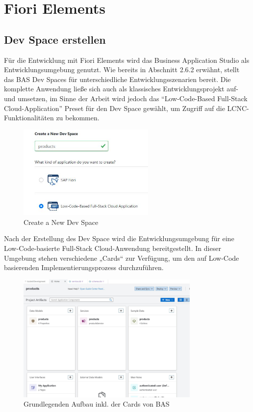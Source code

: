 \section{Fiori Elements}
\subsection{Dev Space erstellen}

Für die Entwicklung mit Fiori Elements wird das Business Application Studio als Entwicklungsumgebung genutzt. Wie bereits in Abschnitt 2.6.2 erwähnt, stellt das BAS Dev Spaces für unterschiedliche Entwicklungsszenarien bereit. Die komplette Anwendung ließe sich auch als klassisches Entwicklungsprojekt auf- und umsetzen, im Sinne der Arbeit wird jedoch das “Low-Code-Based Full-Stack Cloud-Application” Preset für den Dev Space gewählt, um Zugriff auf die LCNC-Funktionalitäten zu bekommen. 

\begin{figure}[htbp]
 \centering
 \includegraphics[width=0.6\textwidth]{Bilder/fiori_element/3_2_create dev space.JPG}
 \caption{Create a New Dev Space}
\end{figure}

Nach der Erstellung des Dev Space wird die Entwicklungsumgebung für eine Low-Code-basierte Full-Stack Cloud-Anwendung bereitgestellt. In dieser Umgebung stehen verschiedene „Cards“ zur Verfügung, um den auf Low-Code basierenden Implementierungsprozess durchzuführen.

\begin{figure}[htbp]
 \centering
 \includegraphics[width=0.8\textwidth]{Bilder/fiori_element/3_3_Cards_von_BAS.JPG}
 \caption{Grundlegenden Aufbau inkl. der Cards von BAS}
\end{figure}

